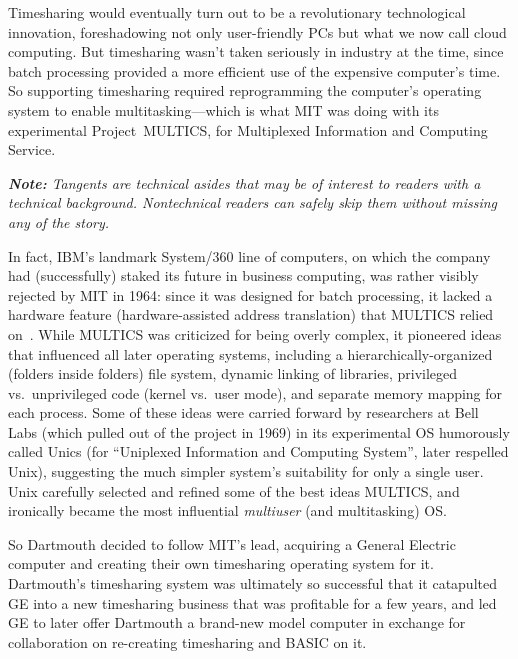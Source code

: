 Timesharing would eventually turn out to be a revolutionary
technological innovation, foreshadowing not only user-friendly PCs but what we now call cloud
computing.
But timesharing wasn't taken seriously in industry at the time, since batch
processing provided a more efficient use of the expensive computer's
time.  So supporting
timesharing required reprogramming the computer's operating
system to enable multitasking---which is what MIT was doing with its
experimental Project~MULTICS, for Multiplexed Information and
Computing Service.


  \begin{tangent}
\emph{\textbf{Note:} Tangents are technical asides that may be of
  interest to readers with a technical background.  Nontechnical
  readers can safely skip them without missing any of the story.}

In fact, IBM's landmark System/360 line of computers, on which the
company had (successfully) staked its future in business computing, was rather visibly
rejected by MIT in 1964: since it was designed for batch processing,
it lacked a hardware feature (hardware-assisted 
address translation) that MULTICS relied on~\cite{ibm360history}.  
While MULTICS was
criticized for being overly complex, it pioneered ideas that influenced
all later operating systems, including a
hierarchically-organized (folders inside folders) file system, dynamic linking of libraries, 
privileged vs.\ unprivileged code (kernel vs.\ user mode), and
separate memory mapping for each process.
Some of these ideas were carried forward by researchers at Bell Labs
(which pulled out 
of the project in 1969) in its experimental OS 
humorously called Unics (for
``Uniplexed Information and Computing System'', later respelled Unix), suggesting the much simpler
system's suitability for only a single user.  Unix carefully selected
and refined some of the best ideas MULTICS, and ironically
became the most influential \emph{multiuser} (and multitasking) OS.
  \end{tangent}

So Dartmouth decided to
follow MIT's lead, acquiring a General Electric computer
and creating their own timesharing
operating system for it.
Dartmouth's timesharing system was ultimately so successful that it
catapulted GE into a new timesharing business that was profitable for a
few years, and led GE to later offer Dartmouth a brand-new model
computer in exchange for collaboration on re-creating timesharing and
BASIC on it.


